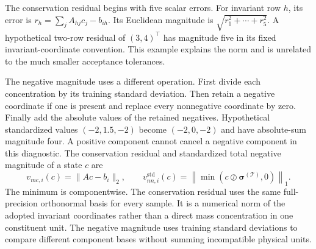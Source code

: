 The conservation residual begins with five scalar errors. For invariant row $h$, its error is $r_h=\sum_jA_{hj}c_j-b_{ih}$. Its Euclidean magnitude is $\sqrt{r_1^2+\cdots+r_5^2}$. A hypothetical two-row residual of $(3,4)^\top$ has magnitude five in its fixed invariant-coordinate convention. This example explains the norm and is unrelated to the much smaller acceptance tolerances.

The negative magnitude uses a different operation. First divide each concentration by its training standard deviation. Then retain a negative coordinate if one is present and replace every nonnegative coordinate by zero. Finally add the absolute values of the retained negatives. Hypothetical standardized values $(-2,1.5,-2)$ become $(-2,0,-2)$ and have absolute-sum magnitude four. A positive component cannot cancel a negative component in this diagnostic. The conservation residual and standardized total negative magnitude of a state $c$ are
\begin{equation}
v_{mc,i}(c)=\|Ac-b_i\|_2,\qquad
v_{nn,i}^{\mathrm{std}}(c)=
\left\|\min(c\oslash\boldsymbol{\sigma}^{(\mathcal{T})},0)\right\|_1.
\label{eq:projection_violation_magnitudes}
\end{equation}
The minimum is componentwise. The conservation residual uses the same full-precision orthonormal basis for every sample. It is a numerical norm of the adopted invariant coordinates rather than a direct mass concentration in one constituent unit. The negative magnitude uses training standard deviations to compare different component bases without summing incompatible physical units.

